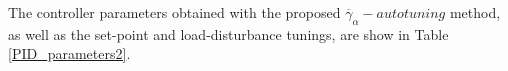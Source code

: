 
The controller parameters obtained with the proposed
$\overline{\gamma}_{\alpha}-autotuning$ method, as well as the
set-point and load-disturbance tunings, are show in Table
\ref{PID_parameters2}.

